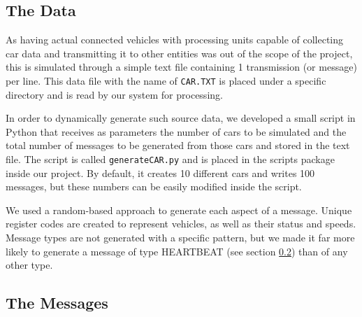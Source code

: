 \documentclass[12pt]{article}
\begin{document}
\subsection{The Data} %

As having actual connected vehicles with processing units capable of collecting car data and transmitting it to other entities was out of the scope of the project, 
this is simulated through a simple text file containing 1 transmission (or message) per line.
This data file with the name of \texttt{CAR.TXT} is placed under a specific directory and is read by our system for processing.

In order to dynamically generate such source data, we developed a small script in Python that receives as parameters the number of cars to be simulated and the 
total number of messages to be generated from those cars and stored in the text file.
The script is called \texttt{generateCAR.py} and is placed in the scripts package inside our project.
By default, it creates 10 different cars and writes 100 messages, but these numbers can be easily modified inside the script. 

We used a random-based approach to generate each aspect of a message.
Unique register codes are created to represent vehicles, as well as their status and speeds.
Message types are not generated with a specific pattern, but we made it far more likely to generate a message of type HEARTBEAT (see section \ref{messages}) 
than of any other type.


\subsection{The Messages} \label{messages} %
\end{document}
